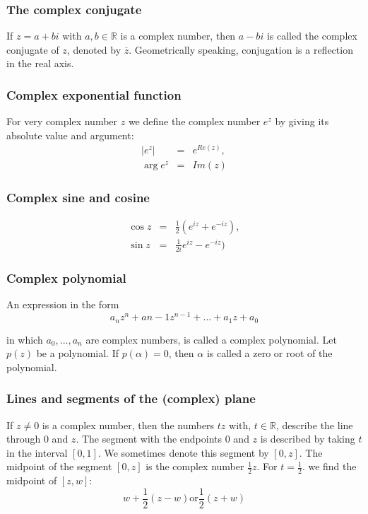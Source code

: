 \documentclass{article}
\begin{document}
			\subsubsection{The complex conjugate}
			If $z = a+bi$ with $a,b \in \mathbb{R}$ is a complex number, then $a-bi$ is called the complex conjugate of $z$, denoted by $\overline{z}$. Geometrically speaking, conjugation is a reflection in the real axis.
			
			\subsubsection{Complex exponential function}
			For very complex number $z$ we define the complex number $e^z$ by giving its absolute value and argument:
			\begin{eqnarray*}
				|e^z| &=& e^{Re(z)}, \\
				\arg{e^z} &=& Im(z)
			\end{eqnarray*}
		
			\subsubsection{Complex sine and cosine}
			\begin{eqnarray*}
				\cos{z} &=& \frac{1}{2}(e^{iz} + e^{-iz}), \\
				\sin{z} &=& \frac{1}{2i}e^{iz} - e^{-iz})
			\end{eqnarray*}
		
			\subsubsection{Complex polynomial}
			An expression in the form
			\begin{equation*}
				a_nz^n + a{n-1}z^{n-1} + ... + a_1z+a_0
			\end{equation*}
			
			in which $a_0,...,a_n$ are complex numbers, is called a complex polynomial. Let $p(z)$ be a polynomial. If $p(\alpha) = 0$, then $\alpha$ is called a zero or root of the polynomial.
			
			\subsubsection{Lines and segments of the (complex) plane}
			If $z \neq 0$ is a complex number, then the numbers $tz$ with, $t \in \mathbb{R}$, describe the line through $0$ and $z$. The segment with the endpoints $0$ and $z$ is described by taking $t$ in the interval $[0,1]$. We sometimes denote this segment by $[0,z]$. The midpoint of the segment $[0,z]$ is the complex number $\frac{1}{2}z$. For $t = \frac{1}{2}$. we find the midpoint of $[z,w]$:
			\begin{equation*}
				w + \frac{1}{2}(z-w) \text{or} \frac{1}{2}(z+w)
			\end{equation*}
			
\end{document}
